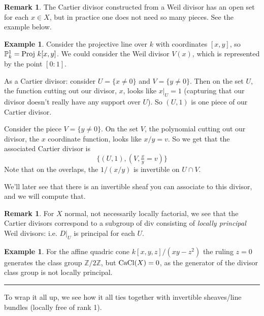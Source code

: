 \documentclass[10pt,reqno]{amsart}
\theoremstyle{definition}
\newtheorem{example}[theorem]{Example}
\newtheorem{remark}[theorem]{Remark}
\theoremstyle{remark}
\numberwithin{equation}{section}
\numberwithin{theorem}{section}
\newcommand*{\red}{\textcolor{red}}
\newcommand{\Z}{{\mathbb Z}}
\newcommand{\proj}{\textup{Proj }}
\newcommand{\PP}{{\mathbb P}}
\begin{document}

\begin{remark} The Cartier divisor constructed from a Weil divisor has an open set for each $x \in X$, but in practice one does not need so many pieces. See the example below.
\end{remark}

\begin{example} Consider the projective line over $k$ with coordinates $[x,y]$, so $\PP^1_k = \proj k[x,y]$. We could consider the Weil divisor $V(x)$, which is represented by the point $[0:1]$. 

As a Cartier divisor: consider $U = \{x \ne 0\}$ and $V = \{y \ne 0\}$. Then on the set $U$, the function  cutting out our divisor, $x$, looks like $x|_U = 1$ (capturing that our divisor doesn't really have any support over $U$). So $(U,1)$ is one piece of our Cartier divisor.

Consider the piece $V = \{y \ne 0\}$. On the set $V$, the polynomial cutting out our divisor, the $x$ coordinate function, looks like $x/y = v$. So we get that the associated Cartier divisor is
\[\{(U,1), (V,\tfrac{x}{y} = v)\}\]
Note that on the overlaps, the $1/(x/y)$ is invertible on $U \cap V$.

We'll later see that there is an invertible sheaf you can associate to this divisor, and we will compute that.
\end{example}

\begin{remark} For $X$ normal, not necessarily locally factorial, we see that the Cartier divisors correspond to a subgroup of div consisting of \textit{locally principal} Weil divisors: i.e. $D|_U$ is principal for each $U$.
\end{remark}

\begin{example} For the affine quadric cone $k[x,y,z]/(xy-z^2)$ the ruling $z = 0$ generates the class group $\Z/2\Z$, but $\textup{CaCl}(X) = 0$, as the generator of the divisor class group is not locally principal.
\end{example}

\hrule
\vspace{1em}



To wrap it all up, we see how it all ties together with invertible sheaves/line bundles (locally free of rank 1).
\end{document}
